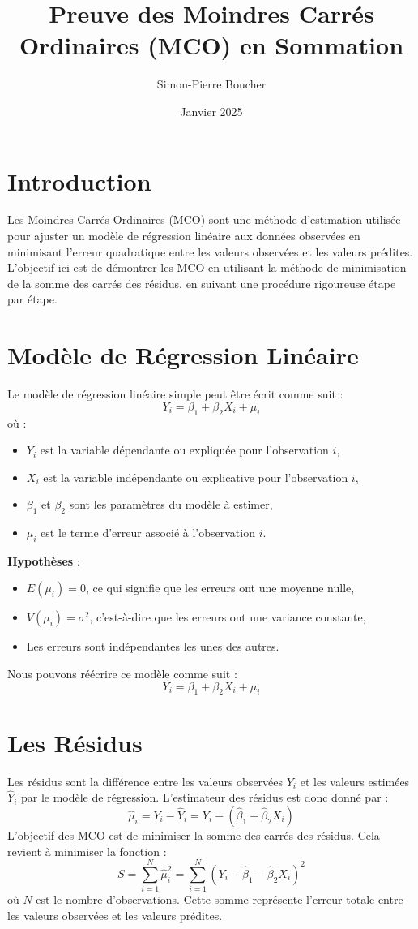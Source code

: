 \documentclass[14pt]{extarticle} %
\title{Preuve des Moindres Carrés Ordinaires (MCO) en Sommation}
\author{Simon-Pierre Boucher}
\date{Janvier 2025}
\begin{document}
\maketitle
\tableofcontents
\newpage

\section{Introduction}
Les Moindres Carrés Ordinaires (MCO) sont une méthode d'estimation utilisée pour ajuster un modèle de régression linéaire aux données observées en minimisant l'erreur quadratique entre les valeurs observées et les valeurs prédites. L'objectif ici est de démontrer les MCO en utilisant la méthode de minimisation de la somme des carrés des résidus, en suivant une procédure rigoureuse étape par étape.

\section{Modèle de Régression Linéaire}
Le modèle de régression linéaire simple peut être écrit comme suit :
\[
Y_i = \beta_1 + \beta_2 X_i + \mu_i
\]
où :
\begin{itemize}
    \item \(Y_i\) est la variable dépendante ou expliquée pour l'observation \(i\),
    \item \(X_i\) est la variable indépendante ou explicative pour l'observation \(i\),
    \item \(\beta_1\) et \(\beta_2\) sont les paramètres du modèle à estimer,
    \item \(\mu_i\) est le terme d'erreur associé à l'observation \(i\).
\end{itemize}

\textbf{Hypothèses} :
\begin{itemize}
    \item \(E(\mu_i) = 0\), ce qui signifie que les erreurs ont une moyenne nulle,
    \item \(V(\mu_i) = \sigma^2\), c'est-à-dire que les erreurs ont une variance constante,
    \item Les erreurs sont indépendantes les unes des autres.
\end{itemize}

Nous pouvons réécrire ce modèle comme suit :
\[
Y_i = \beta_1 + \beta_2 X_i + \mu_i
\]

\section{Les Résidus}
Les résidus sont la différence entre les valeurs observées \(Y_i\) et les valeurs estimées \(\hat{Y}_i\) par le modèle de régression. L'estimateur des résidus est donc donné par :
\[
\hat{\mu}_i = Y_i - \hat{Y}_i = Y_i - (\hat{\beta}_1 + \hat{\beta}_2 X_i)
\]
L'objectif des MCO est de minimiser la somme des carrés des résidus. Cela revient à minimiser la fonction :
\[
S = \sum_{i=1}^N \hat{\mu}_i^2 = \sum_{i=1}^N (Y_i - \hat{\beta}_1 - \hat{\beta}_2 X_i)^2
\]
où \(N\) est le nombre d'observations. Cette somme représente l'erreur totale entre les valeurs observées et les valeurs prédites.
\end{document}

